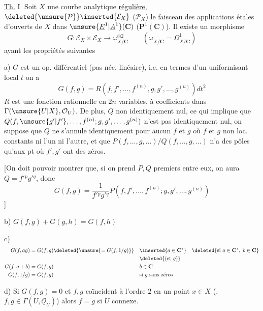\uline{Th.} \textcircled{I} Soit $X$ une courbe analytique \uline{régulière},
$\deleted{\unsure{\mathcal{P}}}\inserted{\mathcal{E}_X}$ ($\mathcal{P}_X$) le
faisceau des applications étales d'ouverts de $X$ dans
$\unsure{\underline{E}^{1}|\underline{A}^{1}}(\mathbf{C})$
($\mathbf{P}^{1}(\mathbf{C})$). Il existe un morphisme
\[
G:\mathcal{E}_X\times\mathcal{E}_X\longrightarrow
\underline{\omega}_{X/\mathbf{C}}^{\otimes2}
\qquad
(\underline{\omega}_{X/\mathbf{C}}=\underline{\Omega}^{1}_{X/\mathbf{C}})
\]
ayant les propriétés suivantes

a) $G$ est un op. différentiel (pas néc. linéaire), i.e. en
termes d'un uniformisant local $t$  on a
\[
G(f,g)=R(f,f',\ldots,f^{(n)},g,g',\ldots,g^{(n)})dt^2
\]
$R$ est une fonction rationnelle en $2n$ variables, à
coefficients dans $\Gamma(\unsure{U|X},\mathcal{O}_U)$.
De plus, 
$Q$ non identiquement nul,  ce qui implique
que $Q(f,\unsure{g'|f'},\ldots,f^{(n)};g,g',\ldots,g^{(n)})$ n'est pas identiquement
nul, on suppose que $Q$ ne s'annule identiquement pour
aucun $f$ et $g$ où $f$ et $g$ non loc. constants ni l'un
ni l'autre, et que $P(f,\ldots,g,\ldots)/Q(f,\ldots,g,\ldots)$ n'a
 des pôles qu'aux pt où $f',g'$ ont des zéros.

[On doit pouvoir montrer que, si on prend $P,Q$
premiers entre eux, on aura 
$Q=f'{}^p g'{}^q$, donc
\[
G(f,g)=\frac{1}{f'{}^p g'{}^q}
P(f,f',\ldots,f^{(n)};g,g',\ldots,g^{(n)})
\]
]

b) $G(f,g)+G(g,h)=G(f,h)$

c)
\[
\begin{aligned}
G(f,ag)&=G(f,g)\deleted{\unsure{=G(f,1/g)}}
&&\inserted{a\in\mathbf{C}^{*}}\quad
\deleted{\text{si }a\in\mathbf{C}^{*},\ b\in\mathbf{C}}\\
&&&\deleted{(\text{et }g)}\\
G(f,g+b)&=G(f,g)&&b\in\mathbf{C}\\
G(f,1/g)&=G(f,g)&&\text{si }g\text{ sans zéros}
\end{aligned}
\]

d)  Si $G(f,g)=0$ et $f,g$ coïncident à l'ordre $2$
en un point $x\in X$ (, $f,g\in\Gamma(U,\underline{\mathcal{O}}_U)$)
alors $f=g$ si $U$ connexe.

